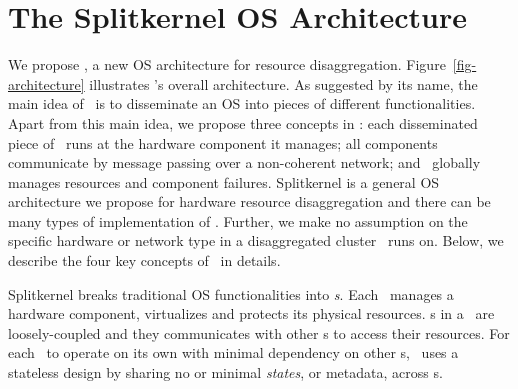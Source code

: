 \documentclass[10pt,times,twocolumn]{z2-article}
\begin{document}
\fi
\section{The Splitkernel OS Architecture}
\label{sec:design}

We propose {\em \splitkernel}, a new OS architecture for resource disaggregation. 
Figure~\ref{fig-architecture} illustrates \splitkernel's overall architecture.
As suggested by its name, the main idea of \splitkernel\ is to disseminate an OS 
into pieces of different functionalities.
Apart from this main idea, we propose three concepts in \splitkernel:
each disseminated piece of \splitkernel\ runs at the hardware component it manages;
all components communicate by message passing over a non-coherent network;
and \splitkernel\ globally manages resources and component failures.
Splitkernel is a general OS architecture we propose for hardware resource disaggregation 
and there can be many types of implementation of \splitkernel.
Further, we make no assumption on the specific hardware or network type in a disaggregated cluster \splitkernel\ runs on.
Below, we describe the four key concepts of \splitkernel\ in details.

Splitkernel breaks traditional OS functionalities into {\em \microos{}s}.
Each \microos\ manages a hardware component, virtualizes and protects its physical resources.
\microos{}s in a \splitkernel\ are loosely-coupled and 
they communicates with other \microos{}s to access their resources. 
For each \microos\ to operate on its own with minimal dependency on other \microos{}s,
\splitkernel\ uses a stateless design by sharing no or minimal {\em states}, or metadata,
across \microos{}s.
\end{document}
